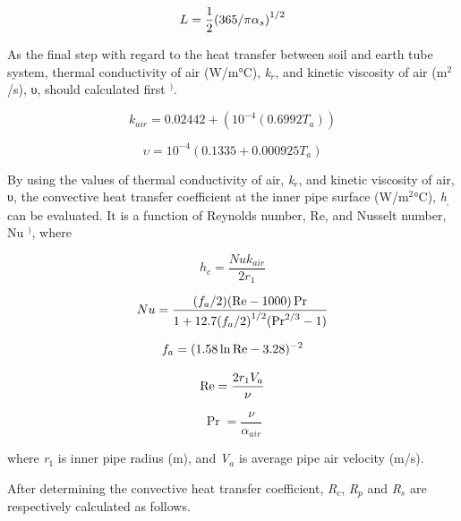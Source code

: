 \begin{equation}
L = \frac{1}{2}{\left( {{\rm{365}}/\pi {\alpha_s}} \right)^{1/2}}
\end{equation}

As the final step with regard to the heat transfer between soil and earth tube system, thermal conductivity of air (W/m°C), \emph{k\(_{r}\)}, and kinetic viscosity of air (m\(^{2}\)/s), υ, should calculated first \(^{)}\).

\begin{equation}
{k_{air}} = 0.02442 + ({10^{ - 4}}(0.6992{T_a}))
\end{equation}

\begin{equation}
\upsilon  = {10^{ - 4}}(0.1335 + 0.000925{T_a})
\end{equation}

By using the values of thermal conductivity of air, \emph{k\(_{r}\)}, and kinetic viscosity of air, υ, the convective heat transfer coefficient at the inner pipe surface (W/m\(^{2}\)°C), \emph{h\(_{,}\)} can be evaluated. It is a function of Reynolds number, Re, and Nusselt number, Nu \(^{)}\), where

\begin{equation}
{h_c} = \frac{{Nu{k_{air}}}}{{2{r_1}}}
\end{equation}

\begin{equation}
Nu = \frac{{({f_a}/2)({\mathop{\rm Re}\nolimits}  - 1000)\Pr }}{{1 + 12.7{{({f_a}/2)}^{1/2}}({{\Pr }^{2/3}} - 1)}}
\end{equation}

\begin{equation}
{f_a} = {(1.58\ln {\mathop{\rm Re}\nolimits}  - 3.28)^{ - 2}}
\end{equation}

\begin{equation}
{\mathop{\rm Re}\nolimits}  = \frac{{2{r_1}{V_a}}}{\nu }
\end{equation}

\begin{equation}
\Pr  = \frac{\nu }{{{\alpha_{air}}}}
\end{equation}

where \emph{r\(_{1}\)} is inner pipe radius (m), and \emph{V\(_{a}\)} is average pipe air velocity (m/s).

After determining the convective heat transfer coefficient, \emph{R\(_{c}\)}, \emph{R\(_{p}\)} and \emph{R\(_{s}\)} are respectively calculated as follows.

